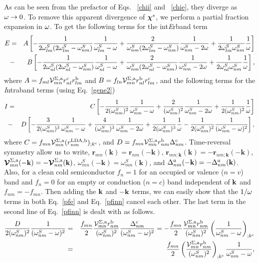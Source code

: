 \documentclass{article}
\begin{document}
As can be seen from the prefactor of Eqs. ~\eqref{chii} and
~\eqref{chie}, they 
diverge as $\omega\to 0$. To remove this apparent 
divergence of $\boldsymbol{\chi}^s$, we perform
a partial fraction  expansion in $\omega$. To get the following terms for
the int{\it E}rband term 
\begin{eqnarray}\label{pfe}  
E&=&  
A
\left[
-\frac{1}{2\omega^S_{lm}(2\omega^S_{lm}-\omega^S_{nm})}\frac{1}{\omega^S_{lm}-\omega}
+\frac{2}{\omega^S_{nm}(2\omega^S_{lm}-\omega^S_{nm})}\frac{1}{\omega^S_{nm}-2\omega}
+\frac{1}{2\omega^S_{lm}\omega^S_{nm}}\frac{1}{\omega}
\right]
\nonumber\\
&-& 
B
\left[
-\frac{1}{2\omega^S_{nl}(2\omega^S_{nl}-\omega^S_{nm})}\frac{1}{\omega^S_{nl}-\omega}
+\frac{2}{\omega^S_{nm}(2\omega^S_{nl}-\omega^S_{nm})}\frac{1}{\omega^S_{nm}-2\omega}
+\frac{1}{2\omega^S_{nl}\omega^S_{nm}}\frac{1}{\omega}
\right]
,
\end{eqnarray}  
where 
$A=f_{ml}{\cal V}^{\Sigma,\mathrm{a}}_{mn}r^{\mathrm{c}}_{nl}r^{\mathrm{b}}_{lm}$   
and
$B=f_{ln}{\cal V}^{\Sigma,\mathrm{a}}_{mn}r^{\mathrm{b}}_{nl}r^{\mathrm{c}}_{lm}$,  
and the following terms for the {\it I}ntraband terms
 (using Eq.~\eqref{gene2})
\begin{eqnarray}\label{pfinn} 
I&=& 
C
\left[
-\frac{1}{2(\omega^S_{nm})^2}\frac{1}{\omega^S_{nm}-\omega}
+\frac{2}{(\omega^S_{nm})^2}\frac{1}{\omega^S_{nm}-2\omega}
+\frac{1}{2(\omega^S_{nm})^2}\frac{1}{\omega}
\right]
\nonumber\\
&-&D
\left[
-\frac{3}{2(\omega^S_{nm})^3}\frac{1}{\omega^S_{nm}-\omega}
+\frac{4}{(\omega^S_{nm})^3}\frac{1}{\omega^S_{nm}-2\omega}
+\frac{1}{2(\omega^S_{nm})^3}\frac{1}{\omega}
-\frac{1}{2(\omega^S_{nm})^2}\frac{1}{(\omega^S_{nm}-\omega)^2}
\right]
,
\end{eqnarray} 
where 
$C=f_{mn}{\cal V}^{\Sigma,\mathrm{a}}_{mn}(r^{\mathrm{LDA},\mathrm{b}}_{nm})_{;k^{\mathrm{c}}}$, 
and
$D=f_{mn}{\cal V}^{\Sigma,\mathrm{a}}_{mn}r^{\mathrm{b}}_{nm}\Delta^{\mathrm{c}}_{nm}$.
Time-reversal symmetry allow us to write,
$\mathbf{r}_{mn}(\mathbf{k})=\mathbf{r}_{nm}(-\mathbf{k})$,
$\mathbf{r}_{mn;\mathbf{k}}(\mathbf{k})=-\mathbf{r}_{nm;\mathbf{k}}(-\mathbf{k})$,
$\boldsymbol{\mathcal{\cal V}}_{mn}^{\Sigma,\mathrm{a}}(-\mathbf{k})=-\boldsymbol{\mathcal{\cal V}}_{nm}^{\Sigma,\mathrm{a}}(\mathbf{k})$,
$\omega_{mn}^{S}(-\mathbf{k})=\omega_{mn}^{S}(\mathbf{k})$,
and
$\Delta^a_{nm}(-\mathbf{k})=-\Delta^a_{nm}(\mathbf{k})$.
Also, for a clean cold semiconductor $f_n=1$  for an occupied or
valence ($n=v$) band and $f_n=0$
for an empty or conduction ($n=c$) band independent of $\mathbf{k}$ and
$f_{nm}=-f_{mn}$. 
Then adding the $\mathbf{k}$ and $-\mathbf{k}$ terms, we
can easily show that the $1/\omega$ terms in both Eq.~\eqref{pfe} and Eq.~\eqref{pfinn}
cancel each other.
The last term in the second line of Eq.~\eqref{pfinn} is dealt with as
follows.
\begin{eqnarray}\label{dresn}
\frac{D}{2(\omega^S_{nm})^2}\frac{1}{(\omega^S_{nm}-\omega)^2}
&=&
\frac{f_{mn}}{2}\frac{{\mathbf{\cal V}}^{\Sigma,\mathrm{a}}_{mn}r^{\mathrm{b}}_{nm}}{(\omega^S_{nm})^2}
\frac{\Delta^{\mathrm{c}}_{nm}}{(\omega^S_{nm}-\omega)^2} 
=
-
\frac{f_{mn}}{2}
\frac{{\mathbf{\cal V}}^{\Sigma,\mathrm{a}}_{mn}r^{\mathrm{b}}_{nm}}{(\omega^S_{nm})^2}
\left(
\frac{1}{\omega^S_{nm}-\omega}
\right)_{;k^{\mathrm{c}}}
\nonumber\\
&=&
\frac{f_{mn}}{2}
\left(
\frac{{\mathbf{\cal V}}^{\Sigma,\mathrm{a}}_{mn}r^{\mathrm{b}}_{nm}}{(\omega^S_{nm})^2}
\right)_{;k^{\mathrm{c}}}
\frac{1}{\omega^S_{nm}-\omega}
,
\end{eqnarray} 
\end{document}
